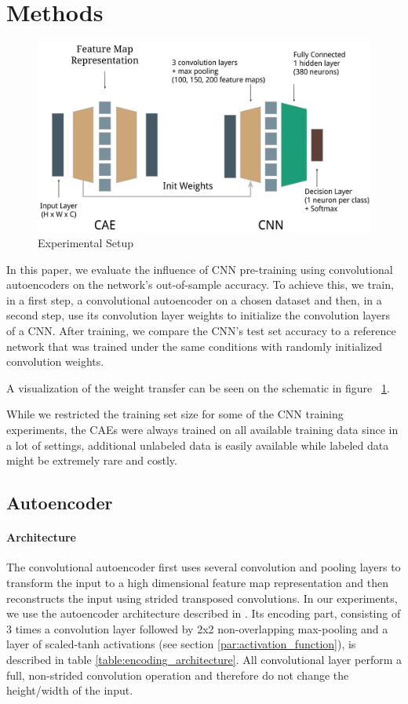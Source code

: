 \documentclass{article}
\begin{document}
\section{Methods}

  \begin{figure}%
    \centering
    \includegraphics[width=0.6\linewidth]{../graphics/setup.png}
    \caption{Experimental Setup}
    \label{fig:experimental_setup}
  \end{figure}

  In this paper, we evaluate the influence of CNN pre-training using convolutional autoencoders on the network's out-of-sample accuracy. To achieve this, we train, in a first step, a convolutional autoencoder on a chosen dataset and then, in a second step, use its convolution layer weights to initialize the convolution layers of a CNN. After training, we compare the CNN's test set accuracy to a reference network that was trained under the same conditions with randomly initialized convolution weights. 

  A visualization of the weight transfer can be seen on the schematic in figure ~\ref{fig:experimental_setup}. 

  While we restricted the training set size for some of the CNN training experiments, the CAEs were always trained on all available training data since in a lot of settings, additional unlabeled data is easily available while labeled data might be extremely rare and costly.  

  \subsection{Autoencoder}
  \label{sec:methods_autoencoder}

    \paragraph{Architecture}
    The convolutional autoencoder first uses several convolution and pooling layers to transform the input to a high dimensional feature map representation and then reconstructs the input using strided transposed convolutions.
    In our experiments, we use the autoencoder architecture described in \citep{masci2011stacked}. Its encoding part, consisting of 3 times a convolution layer followed by 2x2 non-overlapping max-pooling and a layer of scaled-tanh activations (see section \ref{par:activation_function}), is described in table \ref{table:encoding_architecture}. All convolutional layer perform a full, non-strided convolution operation and therefore do not change the height/width of the input.
\end{document}
